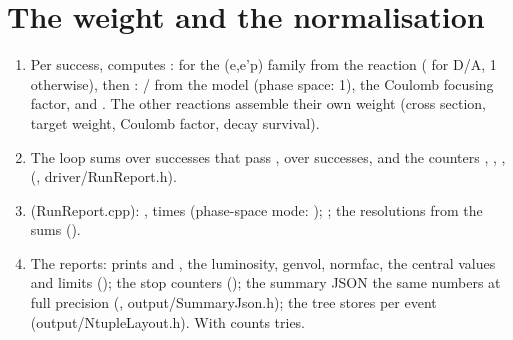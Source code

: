 \section{\texorpdfstring{The weight and the normalisation}{The weight and the normalisation}}\label{developer_manual-03u5farchitecture:36-the-weight-and-the-normalisation}
\begin{enumerate}
\item Per success,  computes : for the (e,e'p) family  from the reaction
( for D/A, 1 otherwise), then : / from the model
(phase space: 1), the Coulomb focusing factor, and . The other reactions assemble their own weight (cross section, target weight, Coulomb factor, decay survival).
\item The loop sums  over successes that pass ,  over successes, and
the counters , , ,  (, driver/\allowbreak{}RunReport.\allowbreak{}h).
\item {} (RunReport.\allowbreak{}cpp): , times 
(phase-space mode: ); ; the resolutions from the sums ().
\item The reports:  prints  and , the
luminosity, genvol, normfac, the central values and limits ();  the stop counters ();
the summary JSON the same numbers at full precision (, output/\allowbreak{}SummaryJson.\allowbreak{}h); the tree stores
 per event (output/\allowbreak{}NtupleLayout.\allowbreak{}h). With   counts tries.
\end{enumerate}
